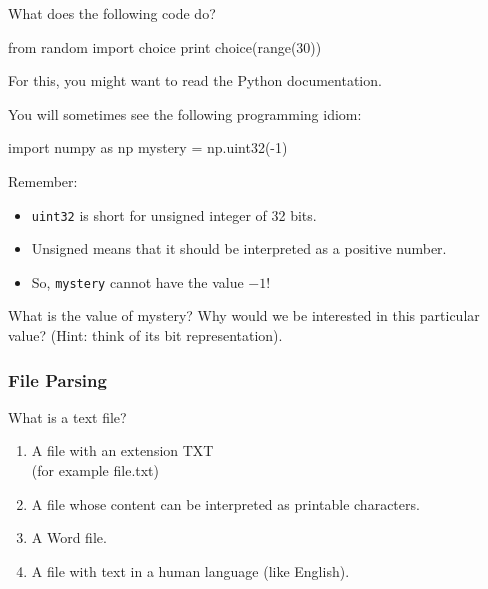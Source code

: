 \begin{frame}[fragile]
{}
What does the following code do?

\begin{python}
from random import choice
print choice(range(30))
\end{python}

For this, you might want to read the Python documentation.
\end{frame}

\begin{frame}[fragile]
{}
You will sometimes see the following programming idiom:

\begin{python}
import numpy as np
mystery = np.uint32(-1)
\end{python}

Remember:
\begin{itemize}
\item \lstinline{uint32} is short for \alert{unsigned integer of 32 bits}.
\item Unsigned means that it should be interpreted as a positive number.
\item So, \lstinline{mystery} cannot have the value $-1$!
\end{itemize}

What is the value of mystery? Why would we be interested in this particular
value? (Hint: think of its bit representation).

\end{frame}

\begin{frame}[fragile]
\frametitle{File Parsing}

What is a text file?

\begin{enumerate}
\item A file with an extension TXT\\
    (for example file.txt)
\item A file whose content can be interpreted as printable characters.
\item A Word file.
\item A file with text in a human language (like English).
\end{enumerate}
\end{frame}




